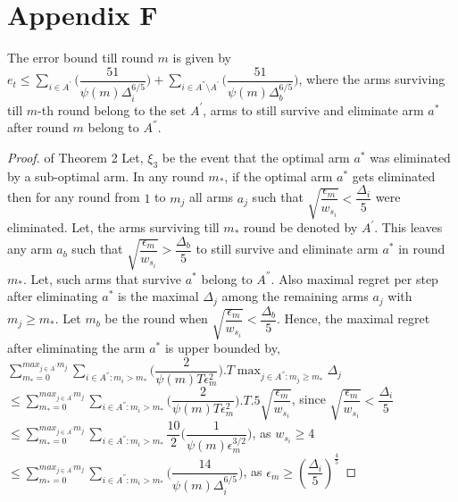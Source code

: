 \section*{Appendix F}
\begin{theorem}
The error bound till round $m$ is given by $e_{t}\leq \sum_{i\in A^{'}}\bigg(\dfrac{51}{\psi(m)\Delta_{i}^{6/5}} \bigg)+\sum_{i\in A^{''}\setminus A^{'}}\bigg(\dfrac{51}{\psi(m)\Delta_{b}^{6/5}} \bigg)$, where the arms surviving till $m$-th round belong to the set $A^{'}$, arms to still survive and eliminate arm $a^{*}$ after round $m$ belong to $A^{''}$.
\end{theorem}
\begin{proof} of Theorem 2
\newline
Let,  $\xi_{3}$ be the event that the optimal arm $a^{*}$ was eliminated by a sub-optimal arm. In any round $m_{*}$, if the optimal arm $a^{*}$ gets eliminated then for any round from $1$ to $m_{j}$ all arms $a_{j}$ such that $\sqrt{\dfrac{\epsilon_{m}}{w_{s_{i}}}}<\dfrac{\Delta_{i}}{5}$ were eliminated. Let, the arms surviving till $m_{*}$ round be denoted by $A^{'}$. This leaves any arm $a_{b}$ such that $\sqrt{\dfrac{\epsilon_{m}}{w_{s_{i}}}}>\dfrac{\Delta_{b}}{5}$ to still survive and eliminate arm $a^{*}$ in round $m_{*}$. Let, such arms that survive $a^{*}$ belong to $A^{''}$. Also maximal regret per step after eliminating $a^{*}$ is the maximal $\Delta_{j}$ among the remaining arms $a_{j}$ with $m_{j}\geq m_{*}$.  Let $m_{b}$ be the round when $\sqrt{\dfrac{\epsilon_{m}}{w_{s_{i}}}}<\dfrac{\Delta_{b}}{5}$. Hence, the maximal regret after eliminating the arm $a^{*}$ is upper bounded by, 
\newline
$\sum_{m_{*}=0}^{max_{j\in A^{'}}m_{j}}\sum_{i\in A^{''}:m_{i}>m_{*}}\bigg(\dfrac{2}{\psi(m)T\epsilon_{m}^{2}} \bigg).T\max_{j\in A^{''}:m_{j}\geq m_{*}}{\Delta}_{j}$
\newline
\hspace*{0em}$\leq\sum_{m_{*}=0}^{max_{j\in A^{'}}m_{j}}\sum_{i\in A^{''}:m_{i}>m_{*}}\bigg(\dfrac{2}{\psi(m)T\epsilon_{m}^{2}} \bigg).T.5\sqrt{\dfrac{\epsilon_{m}}{w_{s_{i}}}}$, since $\sqrt{\dfrac{\epsilon_{m}}{w_{s_{i}}}}<\dfrac{\Delta_{i}}{5}$
\newline
\hspace*{0em}$\leq\sum_{m_{*}=0}^{max_{j\in A^{'}}m_{j}}\sum_{i\in A^{''}:m_{i}>m_{*}}\dfrac{10}{2}\bigg(\dfrac{1}{\psi(m)\epsilon_{m}^{3/2}} \bigg) $, as $w_{s_{i}}\geq 4$
\newline
\hspace*{0em}$\leq\sum_{m_{*}=0}^{max_{j\in A^{'}}m_{j}}\sum_{i\in A^{''}:m_{i}>m_{*}}\bigg(\dfrac{14}{\psi(m)\Delta_{i}^{6/5}} \bigg) $, as $\epsilon_{m}\geq(\dfrac{\Delta_{i}}{5})^{\frac{4}{5}}$

\end{proof}
